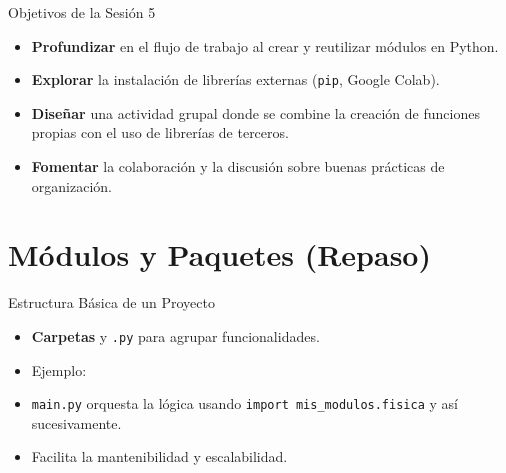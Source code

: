 \documentclass[10pt]{beamer}
\begin{document}
\begin{frame}{Objetivos de la Sesión 5}
  \begin{itemize}
    \item \textbf{Profundizar} en el flujo de trabajo al crear y reutilizar módulos en Python.
    \item \textbf{Explorar} la instalación de librerías externas (\texttt{pip}, Google Colab).
    \item \textbf{Diseñar} una actividad grupal donde se combine la creación de funciones propias con el uso de librerías de terceros.
    \item \textbf{Fomentar} la colaboración y la discusión sobre buenas prácticas de organización.
  \end{itemize}
\end{frame}

\section{Módulos y Paquetes (Repaso)}

\begin{frame}{Estructura Básica de un Proyecto}
  \begin{itemize}
    \item \textbf{Carpetas} y \texttt{.py} para agrupar funcionalidades.
    \item Ejemplo:
    \item \texttt{main.py} orquesta la lógica usando \texttt{import mis\_modulos.fisica} y así sucesivamente.
    \item Facilita la mantenibilidad y escalabilidad.
  \end{itemize}
\end{frame}
\end{document}
